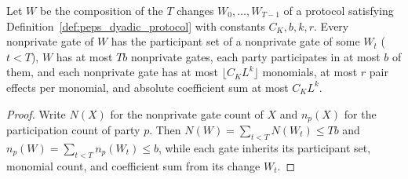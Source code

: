 \begin{lemma}
    \label{lem:peps_protocol_circuit_bounds}
    \leanok
    Let $W$ be the composition of the $T$ changes $W_0,\ldots,W_{T-1}$ of a
    protocol satisfying Definition~\ref{def:peps_dyadic_protocol} with
    constants $C_K,b,k,r$. Every nonprivate gate of $W$ has the participant set
    of a nonprivate gate of some $W_t$ ($t<T$), $W$ has at most $Tb$
    nonprivate gates, each party participates in at most $b$ of them, and each
    nonprivate gate has at most $\lfloor C_KL^k\rfloor$ monomials, at most $r$
    pair effects per monomial, and absolute coefficient sum at most $C_KL^k$.
\end{lemma}
\begin{proof}
    \leanok
    Write $N(X)$ for the nonprivate gate count of $X$ and $n_p(X)$ for the
    participation count of party $p$. Then
    $N(W)=\sum_{t<T}N(W_t)\le Tb$ and $n_p(W)=\sum_{t<T}n_p(W_t)\le b$, while
    each gate inherits its participant set, monomial count, and coefficient sum
    from its change $W_t$.
\end{proof}

